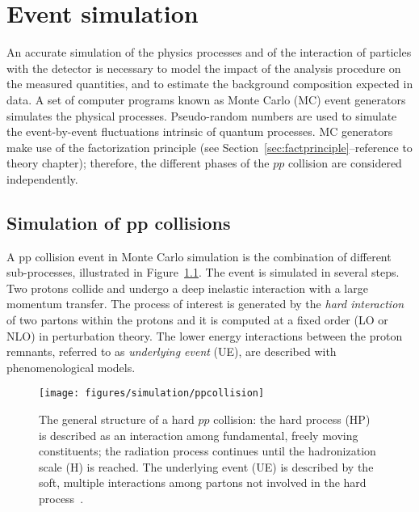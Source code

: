 \chapter{Event simulation}
\label{sec:simulation}

An accurate simulation of the physics processes and of the interaction
of particles with the detector is necessary to model the impact of the
analysis procedure on the measured quantities, and to estimate the
background composition expected in data. A set of computer programs
known as Monte Carlo (MC) event generators simulates the physical
processes.
Pseudo-random numbers are used to simulate the event-by-event
fluctuations intrinsic of quantum processes. MC generators make use of
the factorization principle (see
Section~\ref{sec:factprinciple}--reference to theory chapter); therefore, the
different phases of the $pp$ collision are considered independently.

\section{Simulation of pp collisions}
\label{sec:MCsimulation}

A pp collision event in Monte Carlo simulation
is the combination of different sub-processes,
illustrated in Figure~\ref{fig:collision}.
The event is simulated in several steps. Two protons collide and
undergo a deep inelastic interaction with a large momentum transfer.
The process of interest is generated by the {\it hard interaction} of
two partons within the protons and it is computed at a fixed order (LO
or NLO) in perturbation theory. 
The lower energy interactions between the proton remnants,
referred to as {\it underlying event} (UE), are described with
phenomenological models.

\begin{figure}[ht]
  \begin{center}
    \texttt{[image: figures/simulation/ppcollision]}
    \caption[General structure of a hard $pp$ collision]{
      The general structure of a hard $pp$ collision: the hard process
      (HP) is described as an interaction among fundamental, freely
      moving constituents; the radiation process continues until the
      hadronization scale (H) is reached. The underlying event (UE) is
    described by the soft, multiple interactions among partons not
    involved in the hard process~\cite{mangano2005}.}
    \label{fig:collision}
  \end{center}
\end{figure}


